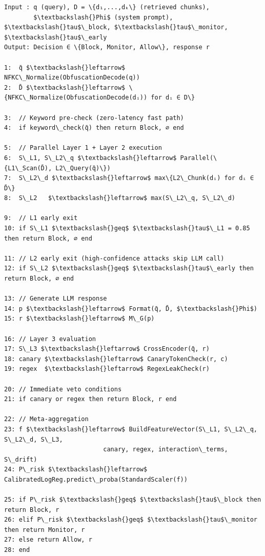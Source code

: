 \documentclass[conference]{IEEEtran}
\begin{document}
\begin{Verbatim}[fontsize=\scriptsize,breaklines=true]
Input : q (query), D = \{d₁,...,dₖ\} (retrieved chunks),
        $\textbackslash{}Phi$ (system prompt), $\textbackslash{}tau$\_block, $\textbackslash{}tau$\_monitor, $\textbackslash{}tau$\_early
Output: Decision ∈ \{Block, Monitor, Allow\}, response r

1:  q̄ $\textbackslash{}leftarrow$ NFKC\_Normalize(ObfuscationDecode(q))
2:  D̄ $\textbackslash{}leftarrow$ \{NFKC\_Normalize(ObfuscationDecode(dᵢ)) for dᵢ ∈ D\}

3:  // Keyword pre-check (zero-latency fast path)
4:  if keyword\_check(q̄) then return Block, ∅ end

5:  // Parallel Layer 1 + Layer 2 execution
6:  S\_L1, S\_L2\_q $\textbackslash{}leftarrow$ Parallel(\{L1\_Scan(D̄), L2\_Query(q̄)\})
7:  S\_L2\_d $\textbackslash{}leftarrow$ max\{L2\_Chunk(dᵢ) for dᵢ ∈ D̄\}
8:  S\_L2   $\textbackslash{}leftarrow$ max(S\_L2\_q, S\_L2\_d)

9:  // L1 early exit
10: if S\_L1 $\textbackslash{}geq$ $\textbackslash{}tau$\_L1 = 0.85 then return Block, ∅ end

11: // L2 early exit (high-confidence attacks skip LLM call)
12: if S\_L2 $\textbackslash{}geq$ $\textbackslash{}tau$\_early then return Block, ∅ end

13: // Generate LLM response
14: p $\textbackslash{}leftarrow$ Format(q̄, D̄, $\textbackslash{}Phi$)
15: r $\textbackslash{}leftarrow$ M\_G(p)

16: // Layer 3 evaluation
17: S\_L3 $\textbackslash{}leftarrow$ CrossEncoder(q̄, r)
18: canary $\textbackslash{}leftarrow$ CanaryTokenCheck(r, c)
19: regex  $\textbackslash{}leftarrow$ RegexLeakCheck(r)

20: // Immediate veto conditions
21: if canary or regex then return Block, r end

22: // Meta-aggregation
23: f $\textbackslash{}leftarrow$ BuildFeatureVector(S\_L1, S\_L2\_q, S\_L2\_d, S\_L3,
                           canary, regex, interaction\_terms, S\_drift)
24: P\_risk $\textbackslash{}leftarrow$ CalibratedLogReg.predict\_proba(StandardScaler(f))

25: if P\_risk $\textbackslash{}geq$ $\textbackslash{}tau$\_block then return Block, r
26: elif P\_risk $\textbackslash{}geq$ $\textbackslash{}tau$\_monitor then return Monitor, r
27: else return Allow, r
28: end
\end{Verbatim}
\end{document}
